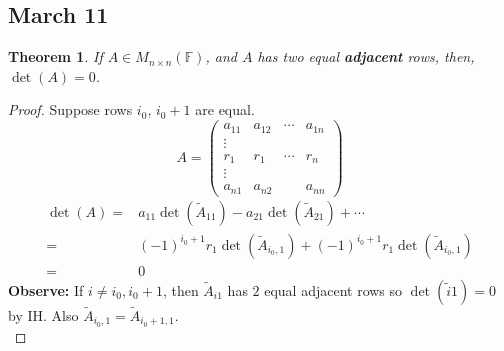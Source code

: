 \documentclass[12pt]{article}
\theoremstyle{plain}
\newtheorem{theorem}{Theorem}[subsection]
\newcommand{\mF}{{\mathbb{F}}}
\begin{document}
\subsection{March 11}
\begin{theorem}
	If $A \in M_{n\times n}(\mF)$, and $A$ has two equal \textbf{adjacent} rows,
	then, $\det(A) = 0$. 
\end{theorem}
\begin{proof}
	Suppose rows $i_0$, $i_{0}+1$ are equal. 
	\[
		A = 
		\begin{pmatrix}
			a_{11} & a_{12} & \cdots & a_{1n}	\\
			\vdots &		&		 &			\\
			r_1	   & r_1	& \cdots & r_n		\\
			\vdots &		&		 &			\\
			a_{n1} & a_{n2}	&		 & a_{nn}	
		\end{pmatrix}
	\]
	\begin{align*}
		\det(A) 
		=& a_{11} \det(\tilde A_{11}) - a_{21} \det(\tilde A_{21}) + \cdots	\\
		=& (-1)^{i_0+1} r_1\det(\tilde A_{i_0, 1}) 
		+ (-1)^{i_0+1} r_1\det(\tilde A_{i_0, 1})	\\
		=& 0
	\end{align*}
	\textbf{Observe: }
	If $i \neq i_0, i_0 + 1$, then $\tilde A_{i1}$ has $2$ equal adjacent rows
	so $\det(\tilde i1) = 0$ by IH. 
	Also $\tilde A_{i_0, 1} = \tilde A_{i_0+1, 1}$.		\\
\end{proof}
\end{document}
